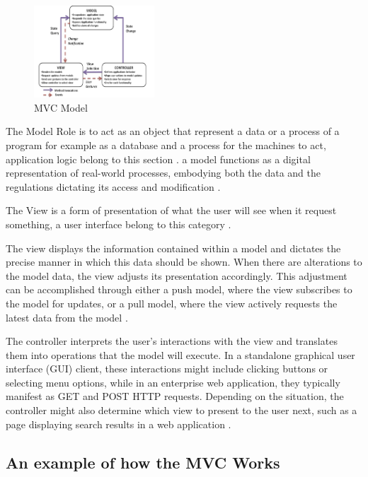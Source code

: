 \documentclass[conference]{IEEEtran}
\begin{document}
\begin{figure}
    \centering
    \includegraphics[width = 0.4\textwidth]{Image/Figure 1.PNG}
    \caption{MVC Model \cite{dey2011comparative}}
    \label{fig:enter-label}
\end{figure}

The Model Role is to act as an object that represent a data or a process of a program for example as a database and a process for the machines to act, application logic belong to this section \cite{thakur2019role}.
a model functions as a digital representation of real-world processes, embodying both the data and the regulations dictating its access and modification \cite{dey2011comparative}.

The View is a form of presentation of what the user will see when it request something, a user interface belong to this category \cite{thakur2019role}.

The view displays the information contained within a model and dictates the precise manner in which this data should be shown. When there are alterations to the model data, the view adjusts its presentation accordingly. This adjustment can be accomplished through either a push model, where the view subscribes to the model for updates, or a pull model, where the view actively requests the latest data from the model \cite{dey2011comparative}.

The controller interprets the user's interactions with the view and translates them into operations that the model will execute. In a standalone graphical user interface (GUI) client, these interactions might include clicking buttons or selecting menu options, while in an enterprise web application, they typically manifest as GET and POST HTTP requests. Depending on the situation, the controller might also determine which view to present to the user next, such as a page displaying search results in a web application \cite{dey2011comparative}.

\subsection{An example of how the MVC Works}
\end{document}
